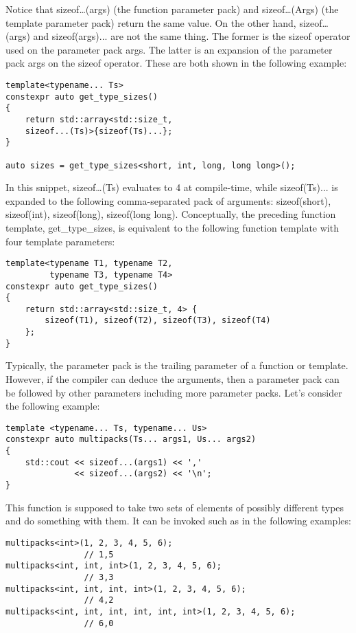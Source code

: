 Notice that sizeof…(args) (the function parameter pack) and sizeof…(Args) (the template parameter pack) return the same value. On the other hand, sizeof…(args) and sizeof(args)... are not the same thing. The former is the sizeof operator used on the parameter pack args. The latter is an expansion of the parameter pack args on the sizeof operator. These are both shown in the following example:

\begin{lstlisting}[style=styleCXX]
template<typename... Ts>
constexpr auto get_type_sizes()
{
	return std::array<std::size_t,
	sizeof...(Ts)>{sizeof(Ts)...};
}

auto sizes = get_type_sizes<short, int, long, long long>();
\end{lstlisting}

In this snippet, sizeof…(Ts) evaluates to 4 at compile-time, while sizeof(Ts)... is expanded to the following comma-separated pack of arguments: sizeof(short), sizeof(int), sizeof(long), sizeof(long long). Conceptually, the preceding function template, get\_type\_sizes, is equivalent to the following function template with four template parameters:

\begin{lstlisting}[style=styleCXX]
template<typename T1, typename T2,
         typename T3, typename T4>
constexpr auto get_type_sizes()
{
	return std::array<std::size_t, 4> {
		sizeof(T1), sizeof(T2), sizeof(T3), sizeof(T4)
	};
}
\end{lstlisting}

Typically, the parameter pack is the trailing parameter of a function or template. However, if the compiler can deduce the arguments, then a parameter pack can be followed by other parameters including more parameter packs. Let's consider the following example:

\begin{lstlisting}[style=styleCXX]
template <typename... Ts, typename... Us>
constexpr auto multipacks(Ts... args1, Us... args2)
{
	std::cout << sizeof...(args1) << ','
	          << sizeof...(args2) << '\n';
}
\end{lstlisting}

This function is supposed to take two sets of elements of possibly different types and do something with them. It can be invoked such as in the following examples:

\begin{lstlisting}[style=styleCXX]
multipacks<int>(1, 2, 3, 4, 5, 6);
                // 1,5
multipacks<int, int, int>(1, 2, 3, 4, 5, 6);
                // 3,3
multipacks<int, int, int, int>(1, 2, 3, 4, 5, 6);
                // 4,2
multipacks<int, int, int, int, int, int>(1, 2, 3, 4, 5, 6);
                // 6,0
\end{lstlisting}

